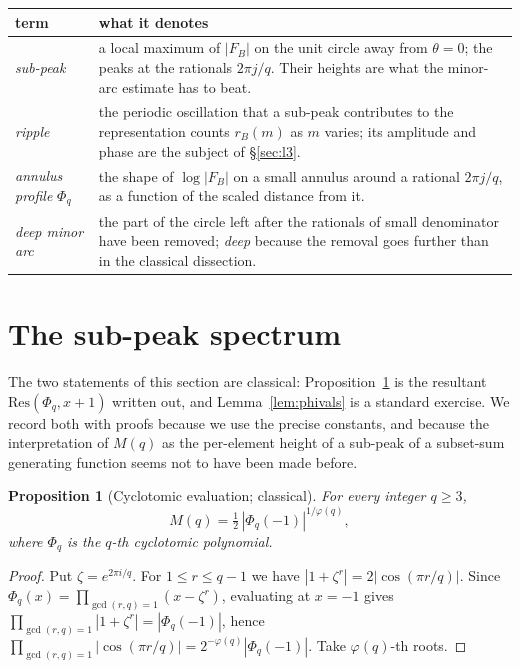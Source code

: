 \documentclass[11pt,a4paper]{article}
\theoremstyle{plain}
\newtheorem{proposition}[theorem]{Proposition}
\theoremstyle{definition}
\theoremstyle{remark}
\begin{document}
\begin{table}[htbp]
\centering
\small
\begin{tabular}{@{}p{3.3cm}p{9.5cm}@{}}
\toprule
term & what it denotes\\
\midrule
\emph{sub-peak} & a local maximum of $|F_B|$ on the unit circle away from
$\theta=0$; the peaks at the rationals $2\pi j/q$. Their heights are what the
minor-arc estimate has to beat.\\[3pt]
\emph{ripple} & the periodic oscillation that a sub-peak contributes to the
representation counts $r_B(m)$ as $m$ varies; its amplitude and phase are the
subject of \S\ref{sec:l3}.\\[3pt]
\emph{annulus profile} $\Phi_q$ & the shape of $\log|F_B|$ on a small annulus around a
rational $2\pi j/q$, as a function of the scaled distance from it.\\[3pt]
\emph{deep minor arc} & the part of the circle left after the rationals of small
denominator have been removed; \emph{deep} because the removal goes further than
in the classical dissection.\\
\bottomrule
\end{tabular}
\end{table}

\section{The sub-peak spectrum}\label{sec:m1}

The two statements of this section are classical: Proposition~\ref{thm:cyc} is
the resultant $\mathrm{Res}(\Phi_q,x+1)$ written out, and
Lemma~\ref{lem:phivals} is a standard exercise. We record both with proofs
because we use the precise constants, and because the interpretation of $M(q)$
as the per-element height of a sub-peak of a subset-sum generating function
seems not to have been made before.

\begin{proposition}[Cyclotomic evaluation; classical]\label{thm:cyc}
For every integer $q\ge3$,
\[
  M(q)=\tfrac12\,|\Phi_q(-1)|^{1/\varphi(q)},
\]
where $\Phi_q$ is the $q$-th cyclotomic polynomial.
\end{proposition}

\begin{proof}
Put $\zeta=e^{2\pi i/q}$. For $1\le r\le q-1$ we have
$|1+\zeta^{r}|=2|\cos(\pi r/q)|$. Since
$\Phi_q(x)=\prod_{\gcd(r,q)=1}(x-\zeta^{r})$, evaluating at $x=-1$ gives
$\prod_{\gcd(r,q)=1}|1+\zeta^{r}|=|\Phi_q(-1)|$, hence
$\prod_{\gcd(r,q)=1}|\cos(\pi r/q)|=2^{-\varphi(q)}|\Phi_q(-1)|$. Take
$\varphi(q)$-th roots.
\end{proof}
\end{document}
